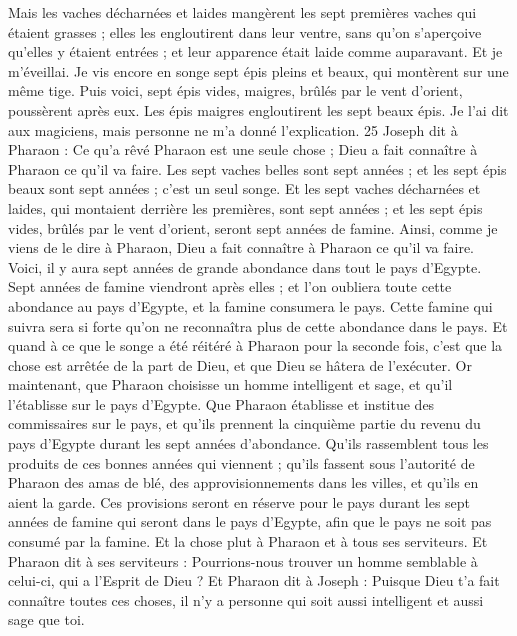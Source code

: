 \begin{multicols}{2}
Mais les vaches décharnées et laides mangèrent les sept premières vaches qui étaient grasses ;
elles les engloutirent dans leur ventre, sans qu'on s'aperçoive qu'elles y étaient entrées ; et leur apparence était laide comme auparavant. Et je m'éveillai.
Je vis encore en songe sept épis pleins et beaux, qui montèrent sur une même tige.
Puis voici, sept épis vides, maigres, brûlés par le vent d'orient, poussèrent après eux.
Les épis maigres engloutirent les sept beaux épis. Je l'ai dit aux magiciens, mais personne ne m'a donné l'explication. 25 Joseph dit à Pharaon : Ce qu'a rêvé Pharaon est une seule chose ; Dieu a fait connaître à Pharaon ce qu'il va faire.
Les sept vaches belles sont sept années ; et les sept épis beaux sont sept années ; c'est un seul songe.
Et les sept vaches décharnées et laides, qui montaient derrière les premières, sont sept années ; et les sept épis vides, brûlés par le vent d'orient, seront sept années de famine.
Ainsi, comme je viens de le dire à Pharaon, Dieu a fait connaître à Pharaon ce qu'il va faire.
Voici, il y aura sept années de grande abondance dans tout le pays d'Egypte.
Sept années de famine viendront après elles ; et l'on oubliera toute cette abondance au pays d'Egypte, et la famine consumera le pays.
Cette famine qui suivra sera si forte qu'on ne reconnaîtra plus de cette abondance dans le pays.
Et quand à ce que le songe a été réitéré à Pharaon  pour la seconde fois, c'est que la chose est arrêtée de la part de Dieu, et que Dieu se hâtera de l'exécuter.
Or maintenant, que Pharaon choisisse un homme intelligent et sage, et qu'il l'établisse sur le pays d'Egypte.
Que Pharaon établisse et institue des commissaires sur le pays, et qu'ils prennent la cinquième partie du revenu du pays d'Egypte durant les sept années d'abondance.
Qu'ils rassemblent tous les produits de ces bonnes années qui viennent ; qu'ils fassent sous l'autorité de Pharaon des amas de blé, des approvisionnements dans les villes, et qu'ils en aient la garde.
Ces provisions seront en réserve pour le pays durant les sept années de famine qui seront dans le pays d'Egypte, afin que le pays ne soit pas consumé par la famine.
Et la chose plut à Pharaon et à tous ses serviteurs.
Et Pharaon dit à ses serviteurs : Pourrions-nous trouver un homme semblable à celui-ci, qui a l'Esprit de Dieu ?
Et Pharaon dit à Joseph : Puisque Dieu t'a fait connaître toutes ces choses, il n'y a personne qui soit aussi intelligent et aussi sage que toi.

\end{multicols}
